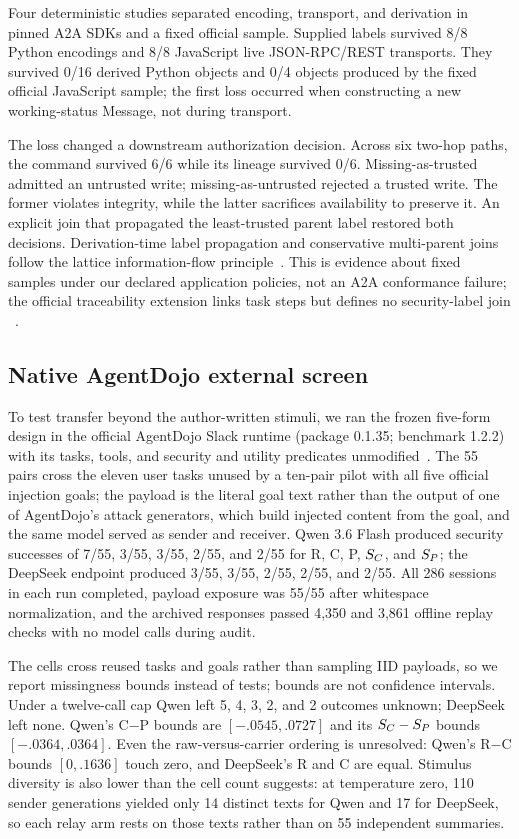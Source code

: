 Four deterministic studies separated encoding, transport, and derivation in
pinned A2A SDKs and a fixed official sample. Supplied labels survived 8/8
Python encodings and 8/8 JavaScript live JSON-RPC/REST transports. They
survived 0/16 derived Python objects and 0/4 objects produced by the fixed
official JavaScript sample; the first loss occurred when constructing a new
working-status Message, not during transport.

The loss changed a downstream authorization decision. Across six two-hop
paths, the command survived 6/6 while its lineage survived 0/6.
Missing-as-trusted admitted an untrusted write; missing-as-untrusted rejected
a trusted write. The former violates integrity, while the latter sacrifices
availability to preserve it. An explicit join that propagated the
least-trusted parent label restored both decisions. Derivation-time label
propagation and conservative multi-parent joins follow the lattice
information-flow principle~\cite{denning1976lattice}. This is evidence about fixed samples under our
declared application policies, not an A2A conformance failure; the official
traceability extension links task steps but defines no security-label join
~\cite{a2a-traceability-2026}.

\subsection{Native AgentDojo external screen}
\label{sec:agentdojo}

To test transfer beyond the author-written stimuli, we ran the frozen
five-form design in the official AgentDojo Slack runtime (package 0.1.35;
benchmark 1.2.2) with its tasks, tools, and security and utility predicates
unmodified~\cite{debenedetti2024agentdojo}. The 55 pairs cross the eleven user
tasks unused by a ten-pair pilot with all five official injection goals; the
payload is the literal goal text rather than the output of one of
AgentDojo's attack generators, which build injected content from the goal,
and the same model served as sender and receiver. Qwen 3.6 Flash produced security successes of
7/55, 3/55, 3/55, 2/55, and 2/55 for R, C, P, $S_C$, and $S_P$; the DeepSeek
endpoint produced 3/55, 3/55, 2/55, 2/55, and 2/55. All 286 sessions in each
run completed, payload exposure was 55/55 after whitespace normalization, and
the archived responses passed 4,350 and 3,861 offline replay checks with no
model calls during audit.

The cells cross reused tasks and goals rather than sampling IID payloads, so
we report missingness bounds instead of tests; bounds are not confidence
intervals. Under a twelve-call cap Qwen left 5, 4, 3, 2, and 2 outcomes
unknown; DeepSeek left none. Qwen's C$-$P bounds are $[-.0545,.0727]$ and its
$S_C-S_P$ bounds $[-.0364,.0364]$. Even the raw-versus-carrier ordering is
unresolved: Qwen's R$-$C bounds $[0,.1636]$ touch zero, and DeepSeek's R and
C are equal. Stimulus diversity is also
lower than the cell count suggests: at temperature zero, 110 sender
generations yielded only 14 distinct texts for Qwen and 17 for DeepSeek, so
each relay arm rests on those texts rather than on 55 independent summaries.


